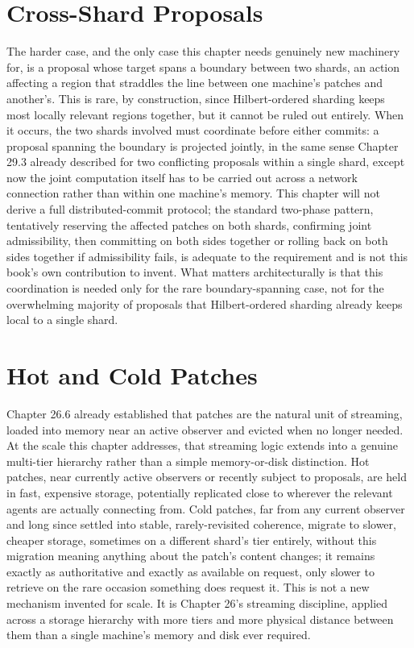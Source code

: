 \section{Cross-Shard Proposals}

The harder case, and the only case this chapter needs genuinely new machinery for, is a proposal whose target spans a boundary between two shards, an action affecting a region that straddles the line between one machine's patches and another's. This is rare, by construction, since Hilbert-ordered sharding keeps most locally relevant regions together, but it cannot be ruled out entirely. When it occurs, the two shards involved must coordinate before either commits: a proposal spanning the boundary is projected jointly, in the same sense Chapter 29.3 already described for two conflicting proposals within a single shard, except now the joint computation itself has to be carried out across a network connection rather than within one machine's memory. This chapter will not derive a full distributed-commit protocol; the standard two-phase pattern, tentatively reserving the affected patches on both shards, confirming joint admissibility, then committing on both sides together or rolling back on both sides together if admissibility fails, is adequate to the requirement and is not this book's own contribution to invent. What matters architecturally is that this coordination is needed only for the rare boundary-spanning case, not for the overwhelming majority of proposals that Hilbert-ordered sharding already keeps local to a single shard.

\section{Hot and Cold Patches}

Chapter 26.6 already established that patches are the natural unit of streaming, loaded into memory near an active observer and evicted when no longer needed. At the scale this chapter addresses, that streaming logic extends into a genuine multi-tier hierarchy rather than a simple memory-or-disk distinction. Hot patches, near currently active observers or recently subject to proposals, are held in fast, expensive storage, potentially replicated close to wherever the relevant agents are actually connecting from. Cold patches, far from any current observer and long since settled into stable, rarely-revisited coherence, migrate to slower, cheaper storage, sometimes on a different shard's tier entirely, without this migration meaning anything about the patch's content changes; it remains exactly as authoritative and exactly as available on request, only slower to retrieve on the rare occasion something does request it. This is not a new mechanism invented for scale. It is Chapter 26's streaming discipline, applied across a storage hierarchy with more tiers and more physical distance between them than a single machine's memory and disk ever required.

